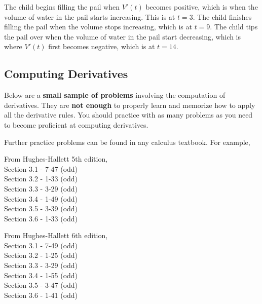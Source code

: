 \begin{enumerate}[1.]
\begin{multicols}{2}
\begin{Solution}
The child begins filling the pail when \(V'(t)\) becomes positive,
which is when the volume of water in the pail starts increasing.  This is
at \(t = 3\).  The child finishes filling the pail when the volume stops
increasing, which is at \(t = 9\).  The child tips the pail over when the 
volume of water in the pail start decreasing, which is where  \(V'(t)\)
first becomes negative, which is at \(t=14\).
\par\end{Solution}
\end{multicols}

\hrulefill

\subsection*{Computing Derivatives}

Below are a {\bf small sample of problems} involving the computation
of derivatives.  They are {\bf not enough} to properly learn and
memorize how to apply all the derivative rules.  You should practice
with as many problems as you need to become proficient at computing
derivatives.

Further practice problems can be found in any calculus textbook.    For example,

\begin{multicols}{2}

From Hughes-Hallett 5th edition,  \\
Section 3.1 - 7-47 (odd) \\
Section 3.2 - 1-33 (odd)  \\
Section 3.3 - 3-29 (odd) \\
Section 3.4 - 1-49 (odd) \\
Section 3.5 - 3-39 (odd) \\  %
Section 3.6 - 1-33 (odd)

\columnbreak

From Hughes-Hallett 6th edition,  \\
Section 3.1 - 7-49 (odd) \\
Section 3.2 - 1-25 (odd)  \\
Section 3.3 - 3-29 (odd) \\
Section 3.4 - 1-55 (odd) \\
Section 3.5 - 3-47 (odd) \\  %
Section 3.6 - 1-41 (odd)


\end{multicols}
\end{enumerate}
